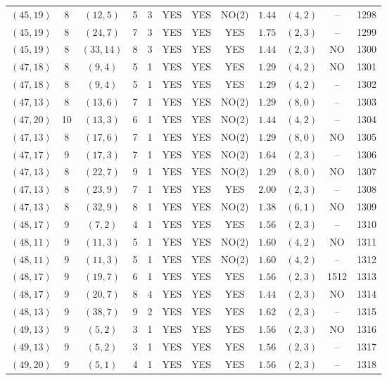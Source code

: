 \begin{longtable}{|c|c|c|c|c|c|c|c|c|c|c|c|}
$(45,19)$ & 8 & $(12,5)$ & 5 & 3 & YES & YES & NO(2) & $1.44$ & $(4,2)$ & -- & 1298\\
$(45,19)$ & 8 & $(24,7)$ & 7 & 3 & YES & YES & YES & $1.75$ & $(2,3)$ & -- & 1299\\
$(45,19)$ & 8 & $(33,14)$ & 8 & 3 & YES & YES & YES & $1.44$ & $(2,3)$ & NO & 1300\\
$(47,18)$ & 8 & $(9,4)$ & 5 & 1 & YES & YES & YES & $1.29$ & $(4,2)$ & NO & 1301\\
$(47,18)$ & 8 & $(9,4)$ & 5 & 1 & YES & YES & YES & $1.29$ & $(4,2)$ & -- & 1302\\
$(47,13)$ & 8 & $(13,6)$ & 7 & 1 & YES & YES & NO(2) & $1.29$ & $(8,0)$ & -- & 1303\\
$(47,20)$ & 10 & $(13,3)$ & 6 & 1 & YES & YES & NO(2) & $1.44$ & $(4,2)$ & -- & 1304\\
$(47,13)$ & 8 & $(17,6)$ & 7 & 1 & YES & YES & NO(2) & $1.29$ & $(8,0)$ & NO & 1305\\
$(47,17)$ & 9 & $(17,3)$ & 7 & 1 & YES & YES & NO(2) & $1.64$ & $(2,3)$ & -- & 1306\\
$(47,13)$ & 8 & $(22,7)$ & 9 & 1 & YES & YES & NO(2) & $1.29$ & $(8,0)$ & NO & 1307\\
$(47,13)$ & 8 & $(23,9)$ & 7 & 1 & YES & YES & YES & $2.00$ & $(2,3)$ & -- & 1308\\
$(47,13)$ & 8 & $(32,9)$ & 8 & 1 & YES & YES & NO(2) & $1.38$ & $(6,1)$ & NO & 1309\\
$(48,17)$ & 9 & $(7,2)$ & 4 & 1 & YES & YES & YES & $1.56$ & $(2,3)$ & -- & 1310\\
$(48,11)$ & 9 & $(11,3)$ & 5 & 1 & YES & YES & NO(2) & $1.60$ & $(4,2)$ & NO & 1311\\
$(48,11)$ & 9 & $(11,3)$ & 5 & 1 & YES & YES & NO(2) & $1.60$ & $(4,2)$ & -- & 1312\\
$(48,17)$ & 9 & $(19,7)$ & 6 & 1 & YES & YES & YES & $1.56$ & $(2,3)$ & 1512 & 1313\\
$(48,17)$ & 9 & $(20,7)$ & 8 & 4 & YES & YES & YES & $1.44$ & $(2,3)$ & NO & 1314\\
$(48,13)$ & 9 & $(38,7)$ & 9 & 2 & YES & YES & YES & $1.62$ & $(2,3)$ & -- & 1315\\
$(49,13)$ & 9 & $(5,2)$ & 3 & 1 & YES & YES & YES & $1.56$ & $(2,3)$ & NO & 1316\\
$(49,13)$ & 9 & $(5,2)$ & 3 & 1 & YES & YES & YES & $1.56$ & $(2,3)$ & -- & 1317\\
$(49,20)$ & 9 & $(5,1)$ & 4 & 1 & YES & YES & YES & $1.56$ & $(2,3)$ & -- & 1318\\

\end{longtable}
